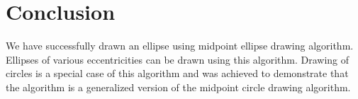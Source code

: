 \documentclass[12pt]{article}
\begin{document}
	\section{Conclusion}
	We have successfully drawn an ellipse using midpoint ellipse drawing algorithm.
	Ellipses of various eccentricities can be drawn using this algorithm. Drawing of
	circles is a special case of this algorithm and was achieved to demonstrate that
	the algorithm is a generalized version of the midpoint circle drawing algorithm.
\end{document}
